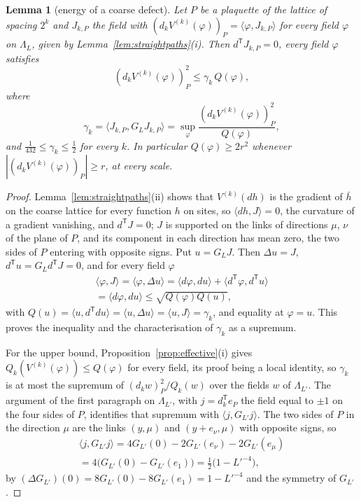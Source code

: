 \documentclass[11pt]{amsart}
\newtheorem{lemma}[theorem]{Lemma}
\theoremstyle{definition}
\theoremstyle{remark}
\numberwithin{equation}{section}
\newcommand{\ip}[2]{\langle #1,#2\rangle}
\begin{document}
\begin{lemma}[energy of a coarse defect]\label{lem:coarseenergy}
Let $P$ be a plaquette of the lattice of spacing $2^k$ and $J_{k,P}$ the
field with $(d_kV^{(k)}(\varphi))_P=\ip{\varphi}{J_{k,P}}$ for every field
$\varphi$ on $\Lambda_L$, given by Lemma~\ref{lem:straightpaths}(i). Then
$d^{\mathsf T}J_{k,P}=0$, every field $\varphi$ satisfies
\[
(d_kV^{(k)}(\varphi))_P^2\le\gamma_k\,Q(\varphi),
\]
where
\[
\gamma_k=\ip{J_{k,P}}{G_LJ_{k,P}}=\sup_\varphi\frac{(d_kV^{(k)}(
\varphi))_P^2}{Q(\varphi)},
\]
and $\frac1{432}\le\gamma_k\le\frac12$ for every $k$. In particular
$Q(\varphi)\ge2r^2$ whenever $|(d_kV^{(k)}(\varphi))_P|\ge r$, at every
scale.
\end{lemma}

\begin{proof}
Lemma~\ref{lem:straightpaths}(ii) shows that $V^{(k)}(dh)$ is the
gradient of $\bar h$ on the coarse lattice for every function $h$ on
sites, so $\ip{dh}{J}=0$, the curvature of a gradient vanishing, and
$d^{\mathsf T}J=0$; $J$ is supported on the links of directions $\mu$,
$\nu$ of the plane of $P$, and its component in each direction has mean
zero, the two sides of $P$ entering with opposite signs. Put $u=G_LJ$.
Then $\Delta u=J$, $d^{\mathsf T}u=G_Ld^{\mathsf T}J=0$, and for every
field $\varphi$
\begin{multline*}
\ip{\varphi}{J}=\ip{\varphi}{\Delta u}=\ip{d\varphi}{du}+\ip{d^{\mathsf T}
\varphi}{d^{\mathsf T}u}\\
=\ip{d\varphi}{du}\le\sqrt{Q(\varphi)Q(u)},
\end{multline*}
with $Q(u)=\ip{u}{d^{\mathsf T}du}=\ip{u}{\Delta u}=\ip{u}{J}=\gamma_k$,
and equality at $\varphi=u$. This proves the inequality and the
characterisation of $\gamma_k$ as a supremum.

For the upper bound, Proposition~\ref{prop:effective}(i) gives
$Q_k(V^{(k)}(\varphi))\le Q(\varphi)$ for every field, its proof being a
local identity, so $\gamma_k$ is at most the supremum of $(d_kw)_P^2/Q_k(w)$
over the fields $w$ of $\Lambda_{L'}$. The argument of the first paragraph
on $\Lambda_{L'}$, with $j=d_k^{\mathsf T}e_P$ the field equal to $\pm1$ on
the four sides of $P$, identifies that supremum with $\ip{j}{G_{L'}j}$. The
two sides of $P$ in the direction $\mu$ are the links $(y,\mu)$ and
$(y+e_\nu,\mu)$ with opposite signs, so
\begin{multline*}
\ip{j}{G_{L'}j}=4G_{L'}(0)-2G_{L'}(e_\nu)-2G_{L'}(e_\mu)\\
=4\bigl(G_{L'}(0)-G_{L'}(e_1)\bigr)=\tfrac12\bigl(1-L'^{-4}\bigr),
\end{multline*}
by $(\Delta G_{L'})(0)=8G_{L'}(0)-8G_{L'}(e_1)=1-L'^{-4}$ and the symmetry
of $G_{L'}$.


\end{proof}
\end{document}
